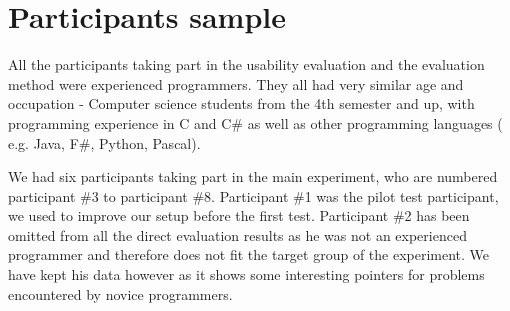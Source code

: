 \section{Participants sample}
\label{section:Participant sample}
All the participants taking part in the usability evaluation and the evaluation method were experienced programmers. They all had very similar age and occupation - Computer science students from the 4th semester and up, with programming experience in C and C\# as well as other programming languages ( e.g. Java, F\#, Python, Pascal).

We had six participants taking part in the main experiment, who are numbered participant \#3 to participant \#8.
Participant \#1 was the pilot test participant, we used to improve our setup before the first test.
Participant \#2 has been omitted from all the direct evaluation results as he was not an experienced programmer and therefore does not fit the target group of the experiment.
We have kept his data however as it shows some interesting pointers for problems encountered by novice programmers.